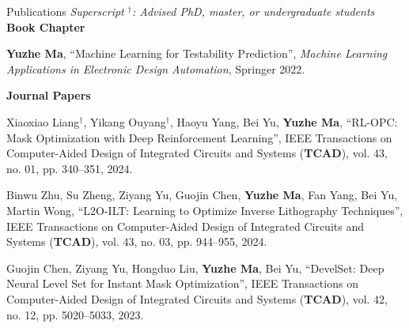 \begin{rSection}{Publications}
\textit{Superscript $^\dagger$: Advised PhD, master, or undergraduate students}\\



\textbf{Book Chapter}
\begin{description}[font=\normalfont]
\item[{[B01]}] {
	\textbf{Yuzhe Ma},
	``Machine Learning for Testability Prediction'',
	\textit{Machine Learning Applications in Electronic Design Automation}, Springer 2022.
}
\end{description}

\textbf{Journal Papers}
\begin{etaremune}
	\renewcommand{\labelenumi}{[J\theenumi]}


\item {
	Xiaoxiao Liang$^\dagger$, Yikang Ouyang$^\dagger$, Haoyu Yang, Bei Yu, \textbf{Yuzhe Ma},
	``RL-OPC: Mask Optimization with Deep Reinforcement Learning'',
    IEEE Transactions on Computer-Aided Design of Integrated Circuits and Systems (\textbf{TCAD}), vol. 43, no. 01, pp. 340--351, 2024.
}

\item {
    Binwu Zhu, Su Zheng, Ziyang Yu, Guojin Chen, \textbf{Yuzhe Ma}, Fan Yang, Bei Yu, Martin Wong,
    ``L2O-ILT: Learning to Optimize Inverse Lithography Techniques'',
    IEEE Transactions on Computer-Aided Design of Integrated Circuits and Systems (\textbf{TCAD}), vol. 43, no. 03, pp. 944--955, 2024.
}

\item {
    Guojin Chen, Ziyang Yu, Hongduo Liu, \textbf{Yuzhe Ma}, Bei Yu, 
    ``DevelSet: Deep Neural Level Set for Instant Mask Optimization'',
    IEEE Transactions on Computer-Aided Design of Integrated Circuits and Systems (\textbf{TCAD}), vol. 42, no. 12, pp. 5020--5033, 2023.
}


\end{etaremune}
\end{rSection}

